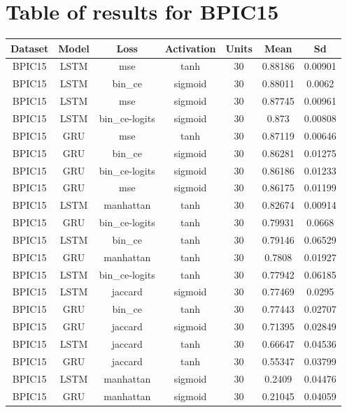 \documentclass{article}%
\begin{document}
%
\normalsize%
\section{Table of results for BPIC15}%
\label{sec:TableofresultsforBPIC15}%
\begin{longtable}{|c|c|c|c|c|c|c|}%
\hline%
\rowcolor{lightgray!70}%
\textbf{Dataset}&\textbf{Model}&\textbf{Loss}&\textbf{Activation}&\textbf{Units}&\textbf{Mean}&\textbf{Sd}\\%
\hline%
BPIC15&LSTM&mse&tanh&30&0.88186&0.00901\\%
\hline%
BPIC15&LSTM&bin\_ce&sigmoid&30&0.88011&0.0062\\%
\hline%
BPIC15&LSTM&mse&sigmoid&30&0.87745&0.00961\\%
\hline%
BPIC15&LSTM&bin\_ce{-}logits&sigmoid&30&0.873&0.00808\\%
\hline%
BPIC15&GRU&mse&tanh&30&0.87119&0.00646\\%
\hline%
BPIC15&GRU&bin\_ce&sigmoid&30&0.86281&0.01275\\%
\hline%
BPIC15&GRU&bin\_ce{-}logits&sigmoid&30&0.86186&0.01233\\%
\hline%
BPIC15&GRU&mse&sigmoid&30&0.86175&0.01199\\%
\hline%
BPIC15&LSTM&manhattan&tanh&30&0.82674&0.00914\\%
\hline%
BPIC15&GRU&bin\_ce{-}logits&tanh&30&0.79931&0.0668\\%
\hline%
BPIC15&LSTM&bin\_ce&tanh&30&0.79146&0.06529\\%
\hline%
BPIC15&GRU&manhattan&tanh&30&0.7808&0.01927\\%
\hline%
BPIC15&LSTM&bin\_ce{-}logits&tanh&30&0.77942&0.06185\\%
\hline%
BPIC15&LSTM&jaccard&sigmoid&30&0.77469&0.0295\\%
\hline%
BPIC15&GRU&bin\_ce&tanh&30&0.77443&0.02707\\%
\hline%
BPIC15&GRU&jaccard&sigmoid&30&0.71395&0.02849\\%
\hline%
BPIC15&LSTM&jaccard&tanh&30&0.66647&0.04536\\%
\hline%
BPIC15&GRU&jaccard&tanh&30&0.55347&0.03799\\%
\hline%
BPIC15&LSTM&manhattan&sigmoid&30&0.2409&0.04476\\%
\hline%
BPIC15&GRU&manhattan&sigmoid&30&0.21045&0.04059\\%
\hline%
\end{longtable}

%
\newpage%
\end{document}
